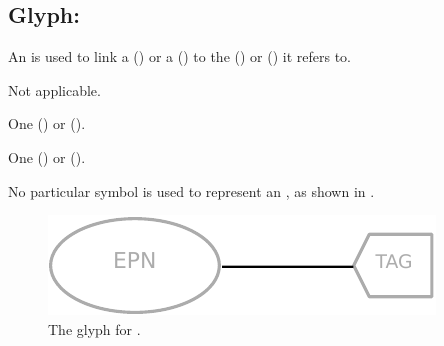 \subsection{Glyph:  }\label{sec:equivalenceArc}

An  is used to link a  () or a  () to the  () or  () it refers to.


\begin{glyphDescription}

\glyphSboTerm
Not applicable.

\glyphOrigin
One  () or  ().

\glyphTarget
One  () or  ().

\glyphSymbol No particular symbol is used to represent an , as shown in .
 \end{glyphDescription}

\begin{figure}[H]
  \centering
  \includegraphics[scale = 0.8]{images/build/equivalence_arc.pdf}
  \caption{The \PD glyph for .}
  \label{fig:equivalenceArc}
\end{figure}
